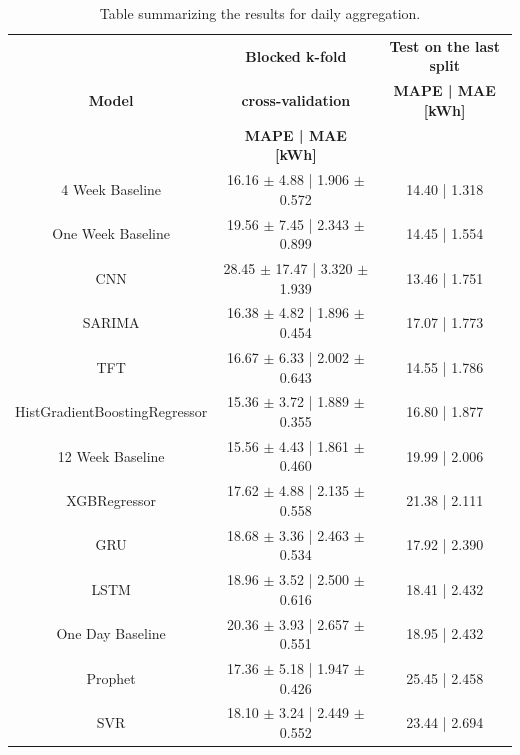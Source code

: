 \begin{table}[H]
\centering
\begin{tabular}{|c|c|c|}
\hline
 & \textbf{Blocked k-fold} & \textbf{Test on the last split}\\
\textbf{Model} & \textbf{cross-validation} & \textbf{MAPE | MAE [kWh]}\\
 & \textbf{MAPE | MAE [kWh]} & \\
\hline
4 Week Baseline & 16.16 $\pm$ 4.88 | 1.906 $\pm$ 0.572 & 14.40 | 1.318\\
\hline
One Week Baseline & 19.56 $\pm$ 7.45 | 2.343 $\pm$ 0.899 & 14.45 | 1.554\\
\hline
CNN & 28.45 $\pm$ 17.47 | 3.320 $\pm$ 1.939 & 13.46 | 1.751\\
\hline
SARIMA & 16.38 $\pm$ 4.82 | 1.896 $\pm$ 0.454 & 17.07 | 1.773\\
\hline
TFT & 16.67 $\pm$ 6.33 | 2.002 $\pm$ 0.643 & 14.55 | 1.786\\
\hline
HistGradientBoostingRegressor & 15.36 $\pm$ 3.72 | 1.889 $\pm$ 0.355 & 16.80 | 1.877\\
\hline
12 Week Baseline & 15.56 $\pm$ 4.43 | 1.861 $\pm$ 0.460 & 19.99 | 2.006\\
\hline
XGBRegressor & 17.62 $\pm$ 4.88 | 2.135 $\pm$ 0.558 & 21.38 | 2.111\\
\hline
GRU & 18.68 $\pm$ 3.36 | 2.463 $\pm$ 0.534 & 17.92 | 2.390\\
\hline
LSTM & 18.96 $\pm$ 3.52 | 2.500 $\pm$ 0.616 & 18.41 | 2.432\\
\hline
One Day Baseline & 20.36 $\pm$ 3.93 | 2.657 $\pm$ 0.551 & 18.95 | 2.432\\
\hline
Prophet & 17.36 $\pm$ 5.18 | 1.947 $\pm$ 0.426 & 25.45 | 2.458\\
\hline
SVR & 18.10 $\pm$ 3.24 | 2.449 $\pm$ 0.552 & 23.44 | 2.694\\
\hline
\end{tabular}
\caption{Table summarizing the results for daily aggregation.}
\label{tab:baselinedailyresults}
\end{table}

